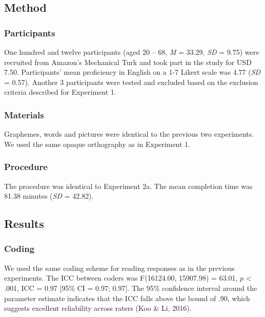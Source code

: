 \documentclass[doc,floatsintext]{apa6}
\begin{document}
\subsection{Method}\label{method-2}

\subsubsection{Participants}\label{participants-2}

One hundred and twelve participants (aged 20 -- 68, \emph{M} = 33.29,
\emph{SD} = 9.75) were recruited from Amazon's Mechanical Turk and took
part in the study for USD 7.50. Participants' mean proficiency in
English on a 1-7 Likert scale was 4.77 (\emph{SD} = 0.57). Another 3
participants were tested and excluded based on the exclusion criteria
described for Experiment 1.

\subsubsection{Materials}\label{materials-2}

Graphemes, words and pictures were identical to the previous two
experiments. We used the same opaque orthography as in Experiment 1.

\subsubsection{Procedure}\label{procedure-2}

The procedure was identical to Experiment 2a. The mean completion time
was 81.38 minutes (\emph{SD} = 42.82).

\subsection{Results}\label{results-2}

\subsubsection{Coding}\label{coding-2}

We used the same coding scheme for reading responses as in the previous
experiments. The ICC between coders was F(16124.00, 15907.98) = 63.01,
\(p\) \textless{} .001, ICC = 0.97 {[}95\% CI = 0.97; 0.97{]}. The 95\%
confidence interval around the parameter estimate indicates that the ICC
falls above the bound of .90, which suggests excellent reliability
across raters (Koo \& Li, 2016).
\end{document}
